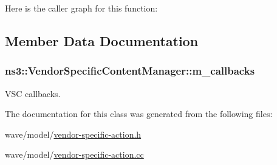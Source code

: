 Here is the caller graph for this function\+:




\subsection{Member Data Documentation}
\subsubsection[{\texorpdfstring{m\+\_\+callbacks}{m_callbacks}}]{ ns3\+::\+Vendor\+Specific\+Content\+Manager\+::m\+\_\+callbacks\hspace{0.3cm}{\ttfamily [private]}}\hypertarget{classns3_1_1VendorSpecificContentManager_ad0158e9d57b8021024fdb08a928cc13b}{}\label{classns3_1_1VendorSpecificContentManager_ad0158e9d57b8021024fdb08a928cc13b}


V\+SC callbacks. 



The documentation for this class was generated from the following files\+:\begin{DoxyCompactItemize}
\item 
wave/model/\hyperlink{vendor-specific-action_8h}{vendor-\/specific-\/action.\+h}\item 
wave/model/\hyperlink{vendor-specific-action_8cc}{vendor-\/specific-\/action.\+cc}\end{DoxyCompactItemize}
